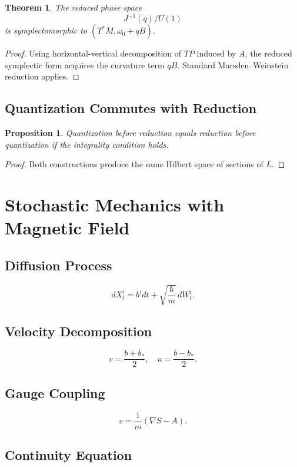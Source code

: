 \documentclass[11pt]{article}
\newtheorem{theorem}{Theorem}
\newtheorem{proposition}{Proposition}
\begin{document}
\begin{theorem}
The reduced phase space
\[
J^{-1}(q)/U(1)
\]
is symplectomorphic to $(T^*M,\omega_0+qB)$.
\end{theorem}

\begin{proof}
Using horizontal-vertical decomposition of $TP$ induced by $A$, the reduced symplectic form acquires the curvature term $qB$. Standard Marsden--Weinstein reduction applies.
\end{proof}

\subsection{Quantization Commutes with Reduction}

\begin{proposition}
Quantization before reduction equals reduction before quantization if the integrality condition holds.
\end{proposition}

\begin{proof}
Both constructions produce the same Hilbert space of sections of $L$.
\end{proof}

\section{Stochastic Mechanics with Magnetic Field}

\subsection{Diffusion Process}

\[
dX_t^i = b^i dt + \sqrt{\frac{\hbar}{m}}\,dW_t^i.
\]

\subsection{Velocity Decomposition}

\[
v = \frac{b+b_*}{2}, \quad u = \frac{b-b_*}{2}.
\]

\subsection{Gauge Coupling}

\[
v = \frac{1}{m}(\nabla S - A).
\]

\subsection{Continuity Equation}
\end{document}
